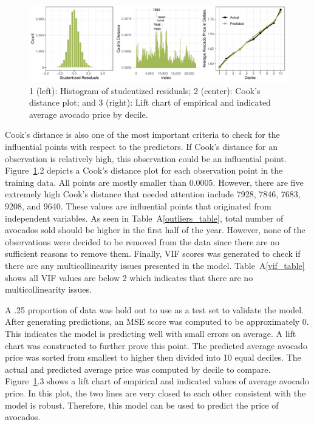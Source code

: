 \documentclass[11pt]{article}\usepackage[]{graphicx}\usepackage[]{color}
\makeatletter
\def\maxwidth{ %
  \ifdim\Gin@nat@width>\linewidth
    \linewidth
  \else
    \Gin@nat@width
  \fi
}
\makeatother
\begin{document}
\begin{figure}[h!] 
\begin{center}

\includegraphics[width=\maxwidth]{figure/unnamed-chunk-4-1} 

\caption{1 (left): Histogram of studentized residuals; 2 (center): Cook's distance plot; and 3 (right): Lift chart of empirical and indicated average avocado price by decile.}
\label{diag1}
\end{center} 
\end{figure}

\noindent Cook's distance is also one of the most important criteria to check for the influential points with respect to the predictors. If Cook's distance for an observation is relatively high, this observation could be an influential point. Figure~\ref{diag1}.2 depicts a Cook's distance plot for each observation point in the training data. All points are mostly smaller than 0.0005. However, there are five extremely high Cook's distance that needed attention include 7928, 7846, 7683, 9208, and 9640. These values are influential points that originated from independent variables. As seen in Table~A\ref{outliers_table}, total number of avocados sold should be higher in the first half of the year. However, none of the observations were decided to be removed from the data since there are no sufficient reasons to remove them. Finally, VIF scores was generated to check if there are any multicollinearity issues presented in the model. Table~A\ref{vif_table} shows all VIF values are below 2 which indicates that there are no multicollinearity issues.
\hfill \break

\noindent A .25 proportion of data was hold out to use as a test set to validate the model. After generating predictions, an MSE score was computed to be approximately 0. This indicates the model is predicting well with small errors on average. A lift chart was constructed to further prove this point.  The predicted average avocado price was sorted from smallest to higher then divided into 10 equal deciles. The actual and predicted average price was computed by decile to compare. Figure~\ref{diag1}.3 shows a lift chart of empirical and indicated values of average avocado price. In this plot, the two lines are very closed to each other consistent with the model is robust. Therefore, this model can be used to predict the price of avocados.   
\hfill \break
\end{document}
